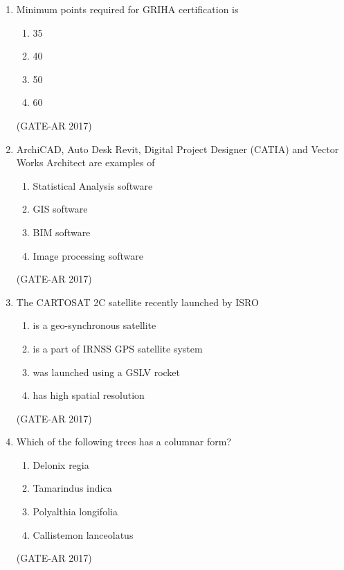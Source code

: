 \documentclass[a4paper,10pt]{article}
\begin{document}
\begin{enumerate}
    \item Minimum points required for GRIHA certification is 
    \begin{multicols}{4}
	\begin{enumerate}
        \item 35
        \item 40
        \item 50
        \item 60
    \end{enumerate}
	\end{multicols}
    \hfill (GATE-AR 2017)

    \item ArchiCAD, Auto Desk Revit, Digital Project Designer (CATIA) and Vector Works Architect are examples of 
    \begin{multicols}{2}
	\begin{enumerate}
        \item Statistical Analysis software
        \item GIS software
        \item BIM software
        \item Image processing software
    \end{enumerate}
	\end{multicols}
    \hfill (GATE-AR 2017)

    \item The CARTOSAT 2C satellite recently launched by ISRO 
    \begin{multicols}{2}
    \begin{enumerate}
        \item is a geo-synchronous satellite
        \item is a part of IRNSS GPS satellite system
        \item was launched using a GSLV rocket
        \item has high spatial resolution
    \end{enumerate}
    \end{multicols}
    \hfill (GATE-AR 2017)

    \item Which of the following trees has a columnar form? 
    \begin{multicols}{2}
	\begin{enumerate}
        \item Delonix regia
        \item Tamarindus indica
        \item Polyalthia longifolia
        \item Callistemon lanceolatus
    \end{enumerate}
	\end{multicols}
    \hfill (GATE-AR 2017)


\end{enumerate}
\end{document}
